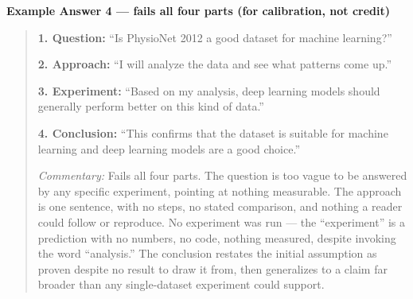 \documentclass{article}
\begin{document}
\bigskip
\noindent\textbf{Example Answer 4 --- fails all four parts (for calibration, not credit)}

\begin{quote}
\textbf{1. Question:} ``Is PhysioNet 2012 a good dataset for machine learning?''

\textbf{2. Approach:} ``I will analyze the data and see what patterns come up.''

\textbf{3. Experiment:} ``Based on my analysis, deep learning models should generally perform better on this kind of data.''

\textbf{4. Conclusion:} ``This confirms that the dataset is suitable for machine learning and deep learning models are a good choice.''

\emph{Commentary:} Fails all four parts. The question is too vague to be answered by any specific experiment, pointing at nothing measurable. The approach is one sentence, with no steps, no stated comparison, and nothing a reader could follow or reproduce. No experiment was run --- the ``experiment'' is a prediction with no numbers, no code, nothing measured, despite invoking the word ``analysis.'' The conclusion restates the initial assumption as proven despite no result to draw it from, then generalizes to a claim far broader than any single-dataset experiment could support.
\end{quote}
\end{document}
